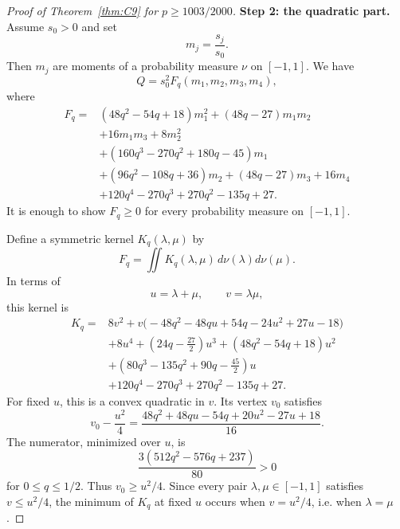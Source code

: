 \documentclass[11pt]{article}
\begin{document}
\begin{proof}[Proof of Theorem~\ref{thm:C9} for $p\ge1003/2000$]
\medskip
\noindent\textbf{Step 2: the quadratic part.}
Assume $s_0>0$ and set
\[
        m_j=\frac{s_j}{s_0}.
\]
Then $m_j$ are moments of a probability measure $\nu$ on $[-1,1]$.  We have
\[
        Q=s_0^2F_q(m_1,m_2,m_3,m_4),
\]
where
\begin{equation}\label{eq:Fq}
\begin{aligned}
F_q={}&(48q^2-54q+18)m_1^2+(48q-27)m_1m_2\\
&+16m_1m_3+8m_2^2\\
&+(160q^3-270q^2+180q-45)m_1\\
&+(96q^2-108q+36)m_2+(48q-27)m_3+16m_4\\
&+120q^4-270q^3+270q^2-135q+27.
\end{aligned}
\end{equation}
It is enough to show $F_q\ge0$ for every probability measure on $[-1,1]$.

Define a symmetric kernel $K_q(\lambda,\mu)$ by
\[
        F_q=\iint K_q(\lambda,\mu)\,d\nu(\lambda)d\nu(\mu).
\]
In terms of
\[
        u=\lambda+\mu,
        \qquad
        v=\lambda\mu,
\]
this kernel is
\begin{equation}\label{eq:Kq-uv}
\begin{aligned}
K_q={}&8v^2
+v\bigl(-48q^2-48qu+54q-24u^2+27u-18\bigr)\\
&+8u^4+\left(24q-\frac{27}{2}\right)u^3
+(48q^2-54q+18)u^2\\
&+\left(80q^3-135q^2+90q-\frac{45}{2}\right)u\\
&+120q^4-270q^3+270q^2-135q+27.
\end{aligned}
\end{equation}
For fixed $u$, this is a convex quadratic in $v$.  Its vertex $v_0$ satisfies
\[
        v_0-\frac{u^2}{4}
        =\frac{48q^2+48qu-54q+20u^2-27u+18}{16}.
\]
The numerator, minimized over $u$, is
\[
        \frac{3(512q^2-576q+237)}{80}>0
\]
for $0\le q\le1/2$.  Thus $v_0\ge u^2/4$.  Since every pair $\lambda,\mu\in[-1,1]$ satisfies $v\le u^2/4$, the minimum of $K_q$ at fixed $u$ occurs when $v=u^2/4$, i.e. when $\lambda=\mu$.


\end{proof}
\end{document}
